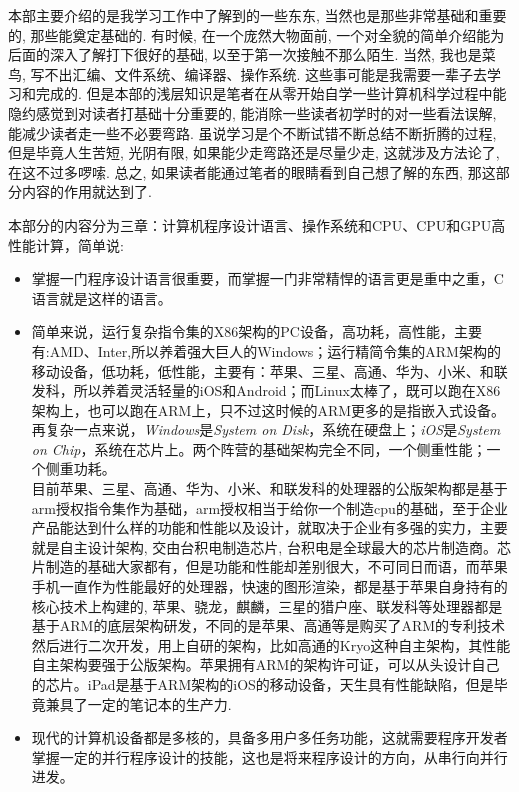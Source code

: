 \documentclass[utf8]{book}
\begin{document}
	本部主要介绍的是我学习工作中了解到的一些东东, 当然也是那些非常基础和重要的, 那些能奠定基础的. 有时候, 在一个庞然大物面前, 一个对全貌的简单介绍能为后面的深入了解打下很好的基础, 以至于第一次接触不那么陌生. 当然, 我也是菜鸟, 写不出汇编、文件系统、编译器、操作系统. 这些事可能是我需要一辈子去学习和完成的. 但是本部的浅层知识是笔者在从零开始自学一些计算机科学过程中能隐约感觉到对读者打基础十分重要的, 能消除一些读者初学时的对一些看法误解, 能减少读者走一些不必要弯路. 虽说学习是个不断试错不断总结不断折腾的过程, 但是毕竟人生苦短, 光阴有限, 如果能少走弯路还是尽量少走, 这就涉及方法论了, 在这不过多啰嗦. 总之, 如果读者能通过笔者的眼睛看到自己想了解的东西, 那这部分内容的作用就达到了.
	
	本部分的内容分为三章：计算机程序设计语言、操作系统和CPU、CPU和GPU高性能计算，简单说:
	\begin{itemize}
	\item 掌握一门程序设计语言很重要，而掌握一门非常精悍的语言更是重中之重，C语言就是这样的语言。
	\item{
		  简单来说，运行复杂指令集的X86架构的PC设备，高功耗，高性能，主要有:AMD、Inter,所以养着强大巨人的Windows；运行精简令集的ARM架构的移动设备，低功耗，低性能，主要有：苹果、三星、高通、华为、小米、和联发科，所以养着灵活轻量的iOS和Android；而Linux太棒了，既可以跑在X86架构上，也可以跑在ARM上，只不过这时候的ARM更多的是指嵌入式设备。再复杂一点来说，\textit{Windows}是\textit{System on Disk}，系统在硬盘上；\textit{iOS}是\textit{System on Chip}，系统在芯片上。两个阵营的基础架构完全不同，一个侧重性能；一个侧重功耗。\\
		  目前苹果、三星、高通、华为、小米、和联发科的处理器的公版架构都是基于arm授权指令集作为基础，arm授权相当于给你一个制造cpu的基础，至于企业产品能达到什么样的功能和性能以及设计，就取决于企业有多强的实力，主要就是自主设计架构, 交由台积电制造芯片, 台积电是全球最大的芯片制造商。芯片制造的基础大家都有，但是功能和性能却差别很大，不可同日而语，而苹果手机一直作为性能最好的处理器，快速的图形渲染，都是基于苹果自身持有的核心技术上构建的, 苹果、骁龙，麒麟，三星的猎户座、联发科等处理器都是基于ARM的底层架构研发，不同的是苹果、高通等是购买了ARM的专利技术然后进行二次开发，用上自研的架构，比如高通的Kryo这种自主架构，其性能自主架构要强于公版架构。苹果拥有ARM的架构许可证，可以从头设计自己的芯片。iPad是基于ARM架构的iOS的移动设备，天生具有性能缺陷，但是毕竟兼具了一定的笔记本的生产力.
	  }
  	\item 现代的计算机设备都是多核的，具备多用户多任务功能，这就需要程序开发者掌握一定的并行程序设计的技能，这也是将来程序设计的方向，从串行向并行进发。
	\end{itemize}
\end{document}
